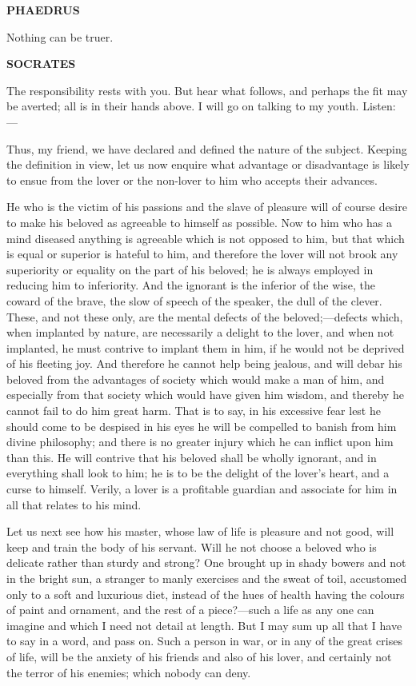 \documentclass[11pt,letter]{article}
\begin{document}
\par \textbf{PHAEDRUS}
\par   Nothing can be truer.

\par \textbf{SOCRATES}
\par   The responsibility rests with you. But hear what follows, and perhaps the fit may be averted; all is in their hands above. I will go on talking to my youth. Listen: —

\par  Thus, my friend, we have declared and defined the nature of the subject. Keeping the definition in view, let us now enquire what advantage or disadvantage is likely to ensue from the lover or the non-lover to him who accepts their advances.

\par  He who is the victim of his passions and the slave of pleasure will of course desire to make his beloved as agreeable to himself as possible. Now to him who has a mind diseased anything is agreeable which is not opposed to him, but that which is equal or superior is hateful to him, and therefore the lover will not brook any superiority or equality on the part of his beloved; he is always employed in reducing him to inferiority. And the ignorant is the inferior of the wise, the coward of the brave, the slow of speech of the speaker, the dull of the clever. These, and not these only, are the mental defects of the beloved;—defects which, when implanted by nature, are necessarily a delight to the lover, and when not implanted, he must contrive to implant them in him, if he would not be deprived of his fleeting joy. And therefore he cannot help being jealous, and will debar his beloved from the advantages of society which would make a man of him, and especially from that society which would have given him wisdom, and thereby he cannot fail to do him great harm. That is to say, in his excessive fear lest he should come to be despised in his eyes he will be compelled to banish from him divine philosophy; and there is no greater injury which he can inflict upon him than this. He will contrive that his beloved shall be wholly ignorant, and in everything shall look to him; he is to be the delight of the lover's heart, and a curse to himself. Verily, a lover is a profitable guardian and associate for him in all that relates to his mind.

\par  Let us next see how his master, whose law of life is pleasure and not good, will keep and train the body of his servant. Will he not choose a beloved who is delicate rather than sturdy and strong? One brought up in shady bowers and not in the bright sun, a stranger to manly exercises and the sweat of toil, accustomed only to a soft and luxurious diet, instead of the hues of health having the colours of paint and ornament, and the rest of a piece?—such a life as any one can imagine and which I need not detail at length. But I may sum up all that I have to say in a word, and pass on. Such a person in war, or in any of the great crises of life, will be the anxiety of his friends and also of his lover, and certainly not the terror of his enemies; which nobody can deny.
\end{document}
